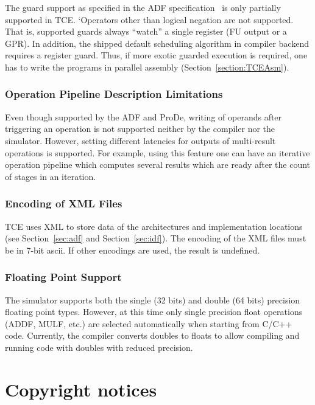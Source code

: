 \documentclass[twoside]{tceusermanual}
\begin{document}
The guard support as specified in the ADF specification~\cite{ADF-specs} is
only partially supported in TCE. `Operators other than logical negation are
not supported. That is, supported guards always ``watch'' a single register
(FU output or a GPR). In addition, the shipped default scheduling algorithm
in compiler backend requires a register guard. Thus, if more exotic guarded
execution is required, one has to write the programs in parallel assembly
(Section~\ref{section:TCEAsm}).

\subsection{Operation Pipeline Description Limitations}

Even though supported by the ADF and ProDe, writing of operands after
triggering an operation is not supported neither by the compiler nor
the simulator. However, setting different latencies for outputs of 
multi-result operations is supported. For example, using this
feature one can have an iterative operation pipeline which computes 
several results which are ready after the count of stages in an iteration.

\subsection{Encoding of XML Files}

TCE uses XML to store data of the architectures and implementation 
locations (see Section~\ref{sec:adf} and Section~\ref{sec:idf}). The
encoding of the XML files must be in 7-bit ascii. If other encodings are
used, the result is undefined.

\subsection{Floating Point Support}

The simulator supports both the single (32 bits) and double
(64 bits) precision floating point types. However, at this time only
single precision float operations (ADDF, MULF, etc.) are selected 
automatically when starting from C/C++ code. Currently, the compiler 
converts doubles to floats to allow compiling and running code with 
doubles with reduced precision.


\chapter{Copyright notices}
\end{document}
